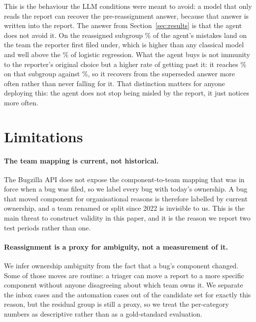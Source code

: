 \documentclass[sigconf,anonymous]{acmart}
\begin{document}
This is the behaviour the LLM conditions were meant to avoid: a model that only reads the report can
recover the pre-reassignment answer, because that answer is written into the report. The answer from
Section~\ref{sec:results} is that the agent does not avoid it. On the reassigned subgroup
\nAgentErrInit\% of the agent's mistakes land on the team the reporter first filed under, which is
higher than any classical model and well above the \nLrErrInit\% of logistic regression. What the
agent buys is not immunity to the reporter's original choice but a higher rate of getting past it:
it reaches \nAgentSpecAcc\% on that subgroup against \nLrSpecAcc\%, so it recovers from the
superseded answer more often rather than never falling for it. That distinction matters for anyone
deploying this: the agent does not stop being misled by the report, it just notices more often.



\section{Limitations}
\label{sec:limitations}


\paragraph{The team mapping is current, not historical.}
The Bugzilla API does not expose the component-to-team mapping that was in force when a bug was
filed, so we label every bug with today's ownership. A bug that moved component for organisational
reasons is therefore labelled by current ownership, and a team renamed or split since 2022 is
invisible to us. This is the main threat to construct validity in this paper, and it is the reason
we report two test periods rather than one.

\paragraph{Reassignment is a proxy for ambiguity, not a measurement of it.}
We infer ownership ambiguity from the fact that a bug's component changed. Some of those moves are
routine: a triager can move a report to a more specific component without anyone disagreeing about
which team owns it. We separate the inbox cases and the automation cases out of the candidate set
for exactly this reason, but the residual group is still a proxy, so we treat the per-category
numbers as descriptive rather than as a gold-standard evaluation.
\end{document}

